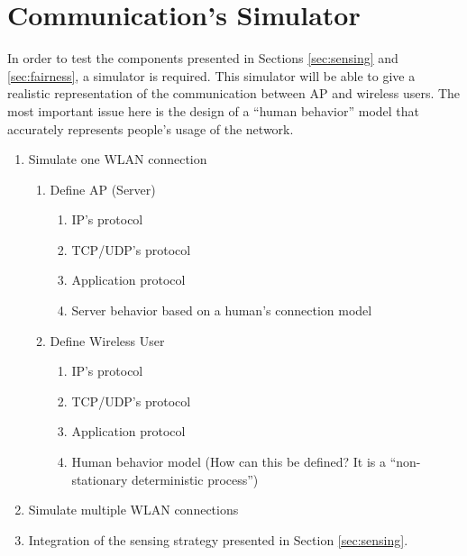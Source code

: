 \documentclass[conference]{ieeeconf}
\begin{document}
\section{Communication's Simulator}
\label{sec:simulator}
In order to test the components presented in Sections \ref{sec:sensing} and \ref{sec:fairness}, a simulator is required.
This simulator will be able to give a realistic representation of the communication between AP and wireless users.
The most important issue here is the design of a ``human behavior'' model that accurately represents people's usage of the network.

\begin{enumerate}
  \item Simulate one WLAN connection
  \begin{enumerate}
    \item Define AP (Server)
    \begin{enumerate} 
      \item IP's protocol
      \item TCP/UDP's protocol
      \item Application protocol 
      \item Server behavior based on a human's connection model
    \end{enumerate} 
    \item Define Wireless User 
    \begin{enumerate}
      \item IP's protocol
      \item TCP/UDP's protocol 
      \item Application protocol
      \item Human behavior model (How can this be defined? It is a ``non-stationary deterministic process'')
    \end{enumerate}
  \end{enumerate}
  \item Simulate multiple WLAN connections
  \item Integration of the sensing strategy presented in Section \ref{sec:sensing}.
\end{enumerate}
\end{document}
